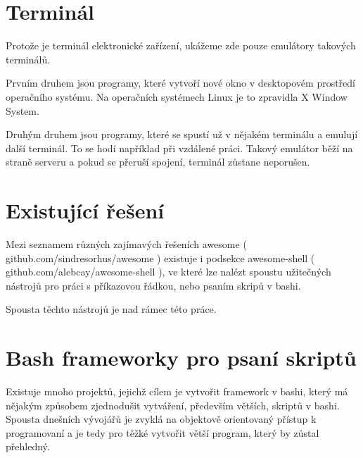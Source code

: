 \documentclass[thesis=M,czech]{FITthesis}[2012/06/26]
\begin{document}
%
%
%
\section{Terminál}



Protože je terminál elektronické zařízení, ukážeme zde pouze emulátory takových terminálů.

Prvním druhem jsou programy, které vytvoří nové okno v desktopovém prostředí operačního systému. Na operačních systémech Linux je to zpravidla X Window System.

Druhým druhem jsou programy, které se spustí už v nějakém terminálu a emulují další terminál. To se hodí například při vzdálené práci. Takový emulátor běží na straně serveru a pokud se přeruší spojení, terminál zůstane neporušen.









\section{Existující řešení}

Mezi seznamem různých zajímavých řešeních awesome ( github.com/sindresorhus/awesome ) existuje i podsekce awesome-shell ( github.com/alebcay/awesome-shell ), ve které lze nalézt spoustu užitečných nástrojů pro práci s příkazovou řádkou, nebo psaním skripů v bashi.

Spousta těchto nástrojů je nad rámec této práce. 


\section{Bash frameworky pro psaní skriptů}

Existuje mnoho projektů, jejichž cílem je vytvořit framework v bashi, který má nějakým způsobem zjednodušit vytváření, především větších, skriptů v bashi. Spousta dnešních vývojářů je zvyklá na objektově orientovaný přístup k programovaní a je tedy pro těžké vytvořit větší program, který by zůstal přehledný.
\end{document}
